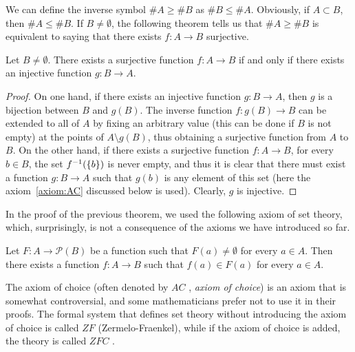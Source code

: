 We can define the inverse symbol $\#A \ge \#B$ 
as $\#B\le \#A$.
Obviously, if $A\subset B$, then $\#A \le \#B$.
If $B\neq \emptyset$, 
the following theorem tells us that $\#A \ge \#B$ 
is equivalent to saying that 
there exists $f\colon A \to B$
surjective. 
%
\begin{theorem}\label{th:95444}
  Let $B\neq \emptyset$.
  There exists a surjective function $f\colon A\to B$ 
  if and only if there exists an injective function $g\colon B\to A$.
\end{theorem}
% 
\begin{proof}
On one hand, if there exists an injective function $g\colon B\to A$, then $g$ is
a bijection
between $B$ and $g(B)$. The inverse function $f\colon g(B) \to B$ 
can be extended to all of $A$ by fixing an arbitrary value 
(this can be done if $B$ is not empty) at the points of $A\setminus g(B)$,
thus obtaining a surjective function from $A$ to $B$.
On the other hand, if there exists a surjective function $f\colon A\to B$,
for every $b\in B$, the set $f^{-1}({\left\{ b \right\}})$ is never 
empty, and thus it is clear that there must exist 
a function $g\colon B\to A$ such that $g(b)$ is any element 
of this set
(here the axiom~\ref{axiom:AC} discussed below is used). 
Clearly, $g$ is injective.
\end{proof}

In the proof of the previous theorem, we used the following axiom 
of set theory, which, surprisingly, is not a consequence of the axioms 
we have introduced so far.

\begin{axiom}[of choice]%
  \label{axiom:AC}%
  Let $F\colon A \to \mathcal P(B)$
  be a function such that $F(a)\neq \emptyset$ 
  for every $a\in A$. Then there exists a function
  $f\colon A \to B$ such that $f(a)\in F(a)$
  for every $a\in A$.
\end{axiom}

The axiom of choice (often denoted by \emph{$AC$}%
%
, \emph{axiom of choice})
is an axiom that is somewhat controversial,
and some mathematicians prefer not to use it in their proofs.
The formal system that defines set theory without 
introducing the axiom of choice 
is called \emph{$ZF$}%
%
 (Zermelo-Fraenkel), while 
if the axiom of choice is added, the theory is called 
\emph{$ZFC$}%
%
.

